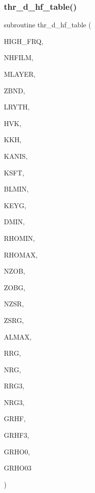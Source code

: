 \subsubsection{\texorpdfstring{thr\+\_\+d\+\_\+hf\+\_\+table()}{thr\_d\_hf\_table()}}
{\footnotesize\ttfamily subroutine thr\+\_\+d\+\_\+hf\+\_\+table (\begin{DoxyParamCaption}\item[{integer, intent(in)}]{H\+I\+G\+H\+\_\+\+F\+RQ,  }\item[{integer, intent(in)}]{N\+H\+F\+I\+LM,  }\item[{integer, intent(in)}]{M\+L\+A\+Y\+ER,  }\item[{real, dimension(0\+:mlayer), intent(in)}]{Z\+B\+ND,  }\item[{real, dimension(mlayer), intent(in)}]{L\+R\+Y\+TH,  }\item[{real, dimension(0\+:mlayer), intent(in)}]{H\+VK,  }\item[{complex, dimension(0\+:mlayer), intent(in)}]{K\+KH,  }\item[{integer, intent(in)}]{K\+A\+N\+IS,  }\item[{integer, intent(in)}]{K\+S\+FT,  }\item[{real, intent(in)}]{B\+L\+M\+IN,  }\item[{integer, intent(in)}]{K\+E\+YG,  }\item[{real, intent(in)}]{D\+M\+IN,  }\item[{real, intent(in)}]{R\+H\+O\+M\+IN,  }\item[{real, intent(in)}]{R\+H\+O\+M\+AX,  }\item[{integer, intent(in)}]{N\+Z\+OB,  }\item[{real, dimension(nzob), intent(in)}]{Z\+O\+BG,  }\item[{integer, intent(in)}]{N\+Z\+SR,  }\item[{real, dimension(2,nzsr), intent(in)}]{Z\+S\+RG,  }\item[{real, intent(in)}]{A\+L\+M\+AX,  }\item[{real, dimension(nhfilm), intent(inout)}]{R\+RG,  }\item[{integer, intent(inout)}]{N\+RG,  }\item[{real, dimension(nhfilm), intent(inout)}]{R\+R\+G3,  }\item[{integer, intent(inout)}]{N\+R\+G3,  }\item[{complex, dimension(11,nhfilm,nzsr,nzob), intent(inout)}]{G\+R\+HF,  }\item[{complex, dimension(11,nhfilm,nzsr), intent(inout)}]{G\+R\+H\+F3,  }\item[{complex, dimension(4,nzsr,nzob), intent(inout)}]{G\+R\+H\+O0,  }\item[{complex, dimension(4,nzsr), intent(inout)}]{G\+R\+H\+O03 }\end{DoxyParamCaption})}

